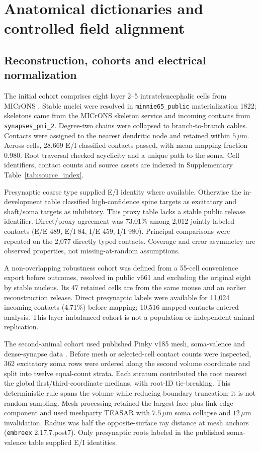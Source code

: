 \section{Anatomical dictionaries and controlled field alignment}
\label{note:anatomical_dictionaries}

\subsection{Reconstruction, cohorts and electrical normalization}
\label{note:microns}
The initial cohort comprises eight layer 2--5 intratelencephalic cells from MICrONS \citep{microns2025}. Stable nuclei were resolved in \texttt{minnie65\_public} materialization 1822; skeletons came from the MICrONS skeleton service and incoming contacts from \texttt{synapses\_pni\_2}. Degree-two chains were collapsed to branch-to-branch cables. Contacts were assigned to the nearest dendritic node and retained within $5\,\mu$m. Across cells, 28,669 E/I-classified contacts passed, with mean mapping fraction 0.980. Root traversal checked acyclicity and a unique path to the soma. Cell identifiers, contact counts and source assets are indexed in Supplementary Table~\ref{tab:source_index}.

Presynaptic coarse type supplied E/I identity where available. Otherwise the in-development  table classified high-confidence spine targets as excitatory and shaft/soma targets as inhibitory. This proxy table lacks a stable public release identifier. Direct/proxy agreement was 73.01\% among 2,012 jointly labeled contacts (E/E 489, E/I 84, I/E 459, I/I 980). Principal comparisons were repeated on the 2,077 directly typed contacts. Coverage and error asymmetry are observed properties, not missing-at-random assumptions.

A non-overlapping robustness cohort was defined from a 55-cell convenience export before outcomes, resolved in public v661 and excluding the original eight by stable nucleus. Its 47 retained cells are from the same mouse and an earlier reconstruction release. Direct presynaptic labels were available for 11,024 incoming contacts (4.71\%) before mapping; 10,516 mapped contacts entered analysis. This layer-imbalanced cohort is not a population or independent-animal replication.

The second-animal cohort used published Pinky v185 mesh, soma-valence and dense-synapse data \citep{turner2022neocortex,microns_pinky_v185}. Before mesh or selected-cell contact counts were inspected, 362 excitatory soma rows were ordered along the second volume coordinate and split into twelve equal-count strata. Each stratum contributed the root nearest the global first/third-coordinate medians, with root-ID tie-breaking. This deterministic rule spans the volume while reducing boundary truncation; it is not random sampling. Mesh processing retained the largest face-plus-link-edge component and used meshparty TEASAR with $7.5\,\mu$m soma collapse and $12\,\mu$m invalidation. Radius was half the opposite-surface ray distance at mesh anchors (\texttt{embreex} 2.17.7.post7). Only presynaptic roots labeled in the published soma-valence table supplied E/I identities.


